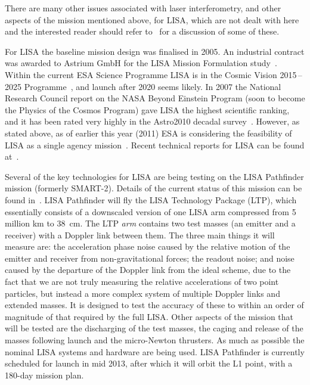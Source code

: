 \documentclass{article}
\begin{document}
There are many other issues associated with laser interferometry, and other
aspects of the mission mentioned above, for LISA, which are not dealt with here
and the interested reader should refer to~\cite{Hough, et.al., Jennrich:2009,
Johann:2008} for a discussion of some of these.

For LISA the baseline mission design was finalised in 2005. An industrial
contract was awarded to Astrium GmbH for the LISA Mission Formulation
study~\cite{Johann:2008}. Within the current ESA Science Programme
LISA is in the Cosmic Vision 2015\,--\,2025
Programme~\cite{ESACosmicVisions}, and launch after 2020 seems
likely. In 2007 the National Research Council report on the NASA
Beyond Einstein Program (soon to become the Physics of the Cosmos
Program) gave LISA the highest scientific ranking, and it has been
rated very highly in the Astro2010 decadal
survey~\cite{astro2010}. However, as stated above, as of earlier this
year (2011) ESA is considering the feasibility of LISA as a single agency
mission~\cite{LISAESAstatement}. Recent technical reports for LISA can
be found at~\cite{LISATechReports}.

Several of the key technologies for LISA are being testing on the LISA
Pathfinder mission (formerly SMART-2). Details of the current status of this
mission can be found in~\cite{Armano:2009}. LISA Pathfinder will fly the LISA
Technology Package (LTP), which essentially consists of a downscaled version of
one LISA arm compressed from 5 million km to 38~cm. The LTP \textit{arm} contains
two test masses (an emitter and a receiver) with a Doppler link between them.
The three main things it will measure are: the acceleration phase noise caused
by the relative motion of the emitter and receiver from non-gravitational
forces; the readout noise; and noise caused by the departure of the Doppler link
from the ideal scheme, due to the fact that we are not truly measuring the
relative accelerations of two point particles, but instead a more complex
system of multiple Doppler links and extended masses. It is designed to test
the accuracy of these to within an order  of magnitude of that required by
the full LISA. Other aspects of the mission that will be tested are the
discharging of the test masses, the caging and release of the masses following
launch and the micro-Newton thrusters. As much as possible the nominal LISA
systems and hardware are being used. LISA Pathfinder is currently scheduled for
launch in mid 2013, after which it will orbit the L1 point, with a 180-day
mission plan.
\end{document}
